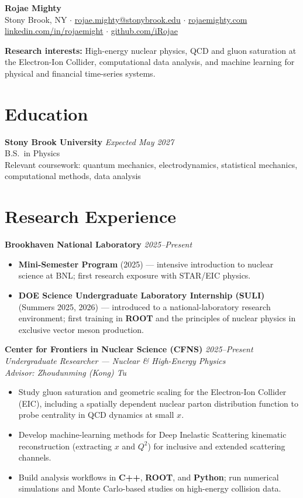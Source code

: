 \documentclass[11pt,letterpaper]{article}
\newcommand{\header}[1]{{\LARGE\bfseries #1}}
\newcommand{\lineitem}[2]{%
  \textbf{#1} \hfill \textit{#2}\\[-2pt]
}
\newcommand{\subheader}[1]{\textit{#1}\\[2pt]}
\newcommand{\cvitem}[1]{\item #1}
\begin{document}
\header{Rojae Mighty}\\[4pt]
Stony Brook, NY \quad$\cdot$\quad
\href{mailto:rojae.mighty@stonybrook.edu}{rojae.mighty@stonybrook.edu} \quad$\cdot$\quad
\href{https://rojaemighty.com}{rojaemighty.com}\\[2pt]
\href{https://www.linkedin.com/in/rojaemight/}{linkedin.com/in/rojaemight} \quad$\cdot$\quad
\href{https://github.com/iRojae}{github.com/iRojae}

\vspace{6pt}
\textbf{Research interests:}
High-energy nuclear physics, QCD and gluon saturation at the Electron-Ion Collider, computational data analysis, and machine learning for physical and financial time-series systems.

\section{Education}
\lineitem{Stony Brook University}{Expected May 2027}
B.S.\ in Physics\\
Relevant coursework: quantum mechanics, electrodynamics, statistical mechanics, computational methods, data analysis

\section{Research Experience}

\lineitem{Brookhaven National Laboratory}{2025--Present}
\begin{itemize}[leftmargin=*, nosep, topsep=2pt]
  \cvitem{\textbf{Mini-Semester Program} (2025) --- intensive introduction to nuclear science at BNL; first research exposure with STAR/EIC physics.}
  \cvitem{\textbf{DOE Science Undergraduate Laboratory Internship (SULI)} (Summers 2025, 2026) --- introduced to a national-laboratory research environment; first training in \textbf{ROOT} and the principles of nuclear physics in exclusive vector meson production.}
\end{itemize}

\lineitem{Center for Frontiers in Nuclear Science (CFNS)}{2025--Present}
\subheader{Undergraduate Researcher --- Nuclear \& High-Energy Physics}
\subheader{Advisor: Zhoudunming (Kong) Tu}
\begin{itemize}[leftmargin=*, nosep, topsep=2pt]
  \cvitem{Study gluon saturation and geometric scaling for the Electron-Ion Collider (EIC), including a spatially dependent nuclear parton distribution function to probe centrality in QCD dynamics at small $x$.}
  \cvitem{Develop machine-learning methods for Deep Inelastic Scattering kinematic reconstruction (extracting $x$ and $Q^2$) for inclusive and extended scattering channels.}
  \cvitem{Build analysis workflows in \textbf{C++}, \textbf{ROOT}, and \textbf{Python}; run numerical simulations and Monte Carlo-based studies on high-energy collision data.}
\end{itemize}
\end{document}
